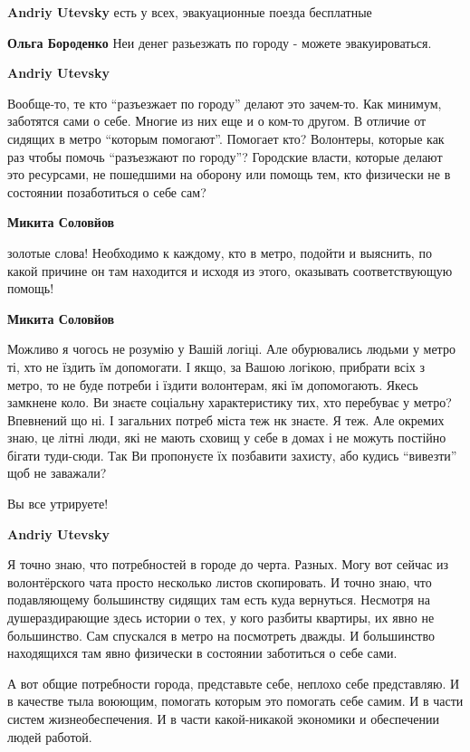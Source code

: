 \begin{itemize}
\begin{itemize}
\textbf{Andriy Utevsky} есть у всех, эвакуационные поезда бесплатные

\textbf{Ольга Бороденко} Неи денег разьезжать по городу - можете эвакуироваться.

\textbf{Andriy Utevsky} 

Вообще-то, те кто \enquote{разъезжает по городу} делают это зачем-то. Как минимум,
заботятся сами о себе. Многие из них еще и о ком-то другом. В отличие от
сидящих в метро \enquote{которым помогают}. Помогает кто? Волонтеры, которые как раз
чтобы помочь \enquote{разъезжают по городу}? Городские власти, которые делают это
ресурсами, не пошедшими на оборону или помощь тем, кто физически не в состоянии
позаботиться о себе сам?

\textbf{Микита Соловйов} 

золотые слова! Необходимо к каждому, кто в метро, подойти и выяснить, по какой
причине он там находится и исходя из этого, оказывать соответствующую помощь!

\textbf{Микита Соловйов} 

Можливо я чогось не розумію у Вашій логіці. Але обурювались людьми у метро ті,
хто не їздить їм допомогати. І якщо, за Вашою логікою, прибрати всіх з метро,
то не буде потреби і їздити волонтерам, які їм допомогають. Якесь замкнене
коло. Ви знаєте соціальну характеристику тих, хто перебуває у метро? Впевнений
що ні. І загальних потреб міста теж нк знаєте. Я теж. Але окремих знаю, це
літні люди, які не мають сховищ у себе в домах і не можуть постійно бігати
туди-сюди. Так Ви пропонуєте їх позбавити захисту, або кудись \enquote{вивезти} щоб не
заважали?

Вы все утрируете!

\textbf{Andriy Utevsky} 

Я точно знаю, что потребностей в городе до черта. Разных. Могу вот сейчас из
волонтёрского чата просто несколько листов скопировать. И точно знаю, что
подавляющему большинству сидящих там есть куда вернуться. Несмотря на
душераздирающие здесь истории о тех, у кого разбиты квартиры, их явно не
большинство. Сам спускался в метро на посмотреть дважды. И большинство
находящихся там явно физически в состоянии заботиться о себе сами.

А вот общие потребности города, представьте себе, неплохо себе представляю. И в
качестве тыла воюющим, помогать которым это помогать себе самим. И в части
систем жизнеобеспечения. И в части какой-никакой экономики и обеспечении людей
работой.


\end{itemize}
\end{itemize}
